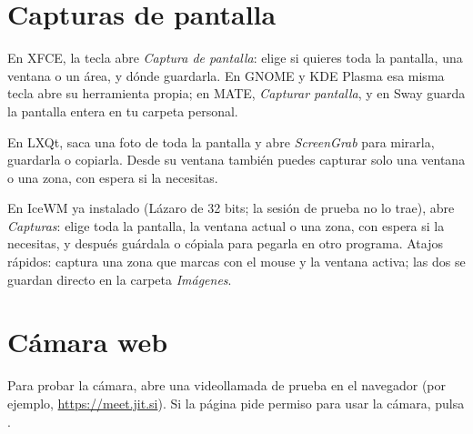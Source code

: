 \section{Capturas de pantalla}

En XFCE, la tecla  abre \emph{Captura de pantalla}: elige si
quieres toda la pantalla, una ventana o un área, y dónde guardarla. En
GNOME y KDE Plasma esa misma tecla abre su herramienta propia; en MATE,
\emph{Capturar pantalla}, y en Sway guarda la pantalla entera en tu
carpeta personal.

En LXQt,  saca una foto de toda la pantalla y abre
\emph{ScreenGrab} para mirarla, guardarla o copiarla. Desde su ventana
también puedes capturar solo una ventana o una zona, con espera si la
necesitas.

En IceWM ya instalado (Lázaro de 32 bits; la sesión de prueba no lo
trae),  abre \emph{Capturas}: elige
toda la pantalla, la ventana actual o una zona, con espera si la
necesitas, y después guárdala o cópiala para pegarla en otro programa.
Atajos rápidos:  captura una zona que marcas con
el mouse y  la ventana activa; las dos se guardan
directo en la carpeta \emph{Imágenes}.

\section{Cámara web}

Para probar la cámara, abre una videollamada de prueba en el navegador
(por ejemplo, \url{https://meet.jit.si}). Si la página pide permiso para
usar la cámara, pulsa .

\fuentes
